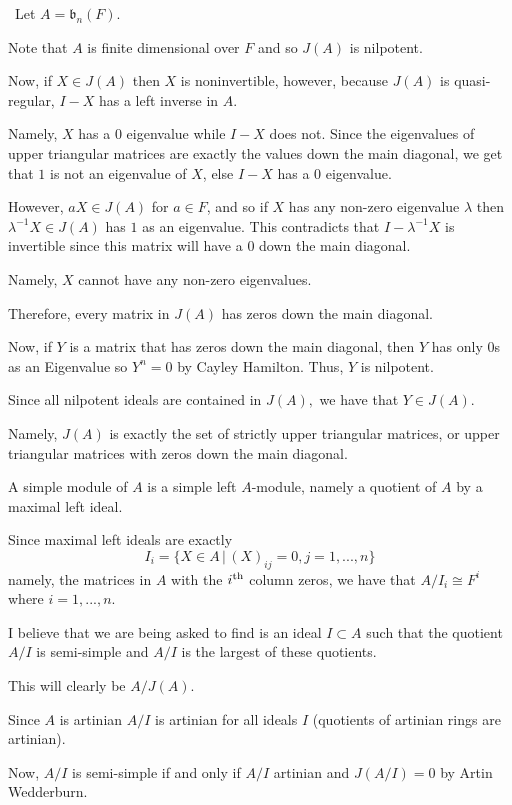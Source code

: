 \documentclass[12pt]{Qual}
\begin{document}
\begin{solution}$\,$
Let $A=\mathfrak{b}_n(F)$.

 Note that $A$ is finite dimensional over $F$ and so $J(A)$ is nilpotent.

Now, if $X\in J(A)$ then $X$ is noninvertible, however, because $J(A)$ is quasi-regular, $I-X$ has a left inverse in $A$.

Namely, $X$ has a $0$ eigenvalue while $I-X$ does not. Since the eigenvalues of upper triangular matrices are exactly the values down the main diagonal, we get that $1$ is not an eigenvalue of $X$, else $I-X$ has a $0$ eigenvalue.

However, $aX\in J(A)$ for $a\in F$, and so if $X$ has any non-zero eigenvalue $\lambda$ then $\lambda^{-1}X\in J(A)$ has $1$ as an eigenvalue. This contradicts that $I-\lambda^{-1}X$ is invertible since this matrix will have a $0$ down the main diagonal.

Namely, $X$ cannot have any non-zero eigenvalues.

Therefore, every matrix in $J(A)$ has zeros down the main diagonal.

Now, if $Y$ is a matrix that has zeros down the main diagonal, then $Y$ has only $0$s as an Eigenvalue so $Y^n=0$ by Cayley Hamilton. Thus, $Y$ is nilpotent.

Since all nilpotent ideals are contained in $J(A),$ we have that $Y\in J(A)$.

Namely, $J(A)$ is exactly the set of strictly upper triangular matrices, or upper triangular matrices with zeros down the main diagonal.

 A simple module of $A$ is a simple left $A$-module, namely a quotient of $A$ by a maximal left ideal.

Since maximal left ideals are exactly $$I_i=\{X\in A\,|\, (X)_{ij}=0, j=1,...,n\}$$ namely, the matrices in $A$ with the $i^\text{th}$ column zeros, we have that $A/I_i\cong F^i$ where $i=1,...,n$.

 I believe that we are being asked to find is an ideal $I\subset A$ such that the quotient $A/I$ is semi-simple and $A/I$ is the largest of these quotients.

This will clearly be $A/J(A).$

Since $A$ is artinian $A/I$ is artinian for all ideals $I$ (quotients of artinian rings are artinian).

Now, $A/I$ is semi-simple if and only if $A/I$ artinian and $J(A/I)=0$ by Artin Wedderburn.


\end{solution}
\end{document}

